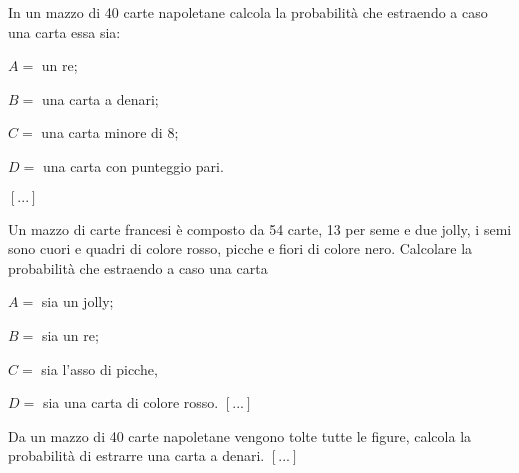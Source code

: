 \begin{esercizio}
 \label{ese:9.20}
 In un mazzo di 40 carte napoletane calcola la probabilità che estraendo a caso 
una carta essa sia:
\begin{itemize*}
\item \( A= \) un re;
\item \( B= \) una carta a denari;
\item \( C= \) una carta minore di 8;
\item \( D = \) una carta con punteggio pari.
\end{itemize*}
\hfill \(\left[...\right]\)
\end{esercizio}

\begin{esercizio}
 \label{ese:9.21}
Un mazzo di carte francesi è composto da 54 carte, 13 per seme e due jolly, i 
semi sono cuori e quadri di colore rosso, picche e fiori di colore nero. 
Calcolare la probabilità che estraendo a caso una carta
\begin{itemize*}
\item \( A= \) sia un jolly;
\item \( B= \) sia un re;
\item \( C= \) sia l'asso di picche,
\item \( D= \) sia una carta di colore rosso.
\hfill \(\left[...\right]\)
\end{itemize*}
\end{esercizio}

\begin{esercizio}
 \label{ese:9.22}
Da un mazzo di 40 carte napoletane vengono tolte tutte le figure, calcola la 
probabilità di estrarre una carta a denari.
\hfill \(\left[...\right]\)
\end{esercizio}


